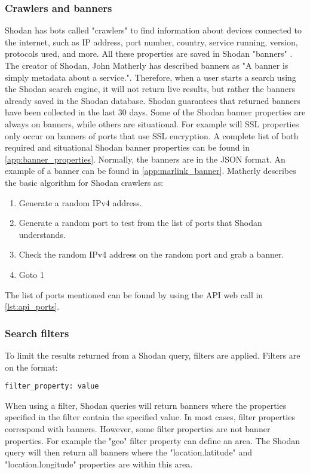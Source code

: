 \subsubsection{Crawlers and banners}
Shodan has bots called "crawlers" to find information about devices connected to the internet, such as IP address, port number, country, service running, version, protocols used, and more. 
All these properties are saved in Shodan "banners" . The creator of Shodan, John Matherly has described banners as "A banner is simply metadata about a service.". \cite{banner} 
Therefore, when a user starts a search using the Shodan search engine, it will not return live results, but rather the banners already saved in the Shodan database. Shodan guarantees that returned banners have been collected in the last 30 days.\cite{matherly_guide_to_shodan}
Some of the Shodan banner properties are always on banners, while others are situational. For example will SSL properties only occur on banners of ports that use SSL encryption. A complete list of both required and situational Shodan banner properties can be found in \cref{app:banner_properties}.
Normally, the banners are in the JSON format. An example of a banner can be found in \cref{app:marlink_banner}.
Matherly\cite{matherly_guide_to_shodan} describes the basic algorithm for Shodan crawlers as:
\begin{enumerate}
\setlength\itemsep{0em}
	\item Generate a random IPv4 address. 
	\item Generate a random port to test from the list of ports that Shodan understands.
	\item Check the random IPv4 address on the random port and grab a banner.
	\item Goto 1
\end{enumerate}
The list of ports mentioned can be found by using the API web call in \cref{lst:api_ports}.

\subsubsection{Search filters} \label{sec:filters}
To limit the results returned from a Shodan query, filters are applied. Filters are on the format:
\begin{lstlisting}
filter_property: value
\end{lstlisting}
When using a filter, Shodan queries will return banners where the properties specified in the filter contain the specified value. In most cases, filter properties correspond with banners. However, some filter properties are not banner properties. For example the "geo" filter property can define an area. The Shodan query will then return all banners where the "location.latitude" and "location.longitude" properties are within this area. 

